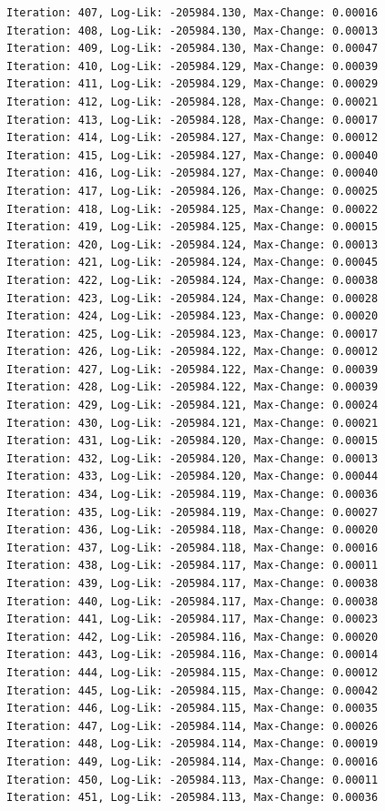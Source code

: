 \documentclass[
  letterpaper,
  DIV=11,
  numbers=noendperiod]{scrreport}
\begin{document}
\begin{verbatim}
Iteration: 407, Log-Lik: -205984.130, Max-Change: 0.00016
Iteration: 408, Log-Lik: -205984.130, Max-Change: 0.00013
Iteration: 409, Log-Lik: -205984.130, Max-Change: 0.00047
Iteration: 410, Log-Lik: -205984.129, Max-Change: 0.00039
Iteration: 411, Log-Lik: -205984.129, Max-Change: 0.00029
Iteration: 412, Log-Lik: -205984.128, Max-Change: 0.00021
Iteration: 413, Log-Lik: -205984.128, Max-Change: 0.00017
Iteration: 414, Log-Lik: -205984.127, Max-Change: 0.00012
Iteration: 415, Log-Lik: -205984.127, Max-Change: 0.00040
Iteration: 416, Log-Lik: -205984.127, Max-Change: 0.00040
Iteration: 417, Log-Lik: -205984.126, Max-Change: 0.00025
Iteration: 418, Log-Lik: -205984.125, Max-Change: 0.00022
Iteration: 419, Log-Lik: -205984.125, Max-Change: 0.00015
Iteration: 420, Log-Lik: -205984.124, Max-Change: 0.00013
Iteration: 421, Log-Lik: -205984.124, Max-Change: 0.00045
Iteration: 422, Log-Lik: -205984.124, Max-Change: 0.00038
Iteration: 423, Log-Lik: -205984.124, Max-Change: 0.00028
Iteration: 424, Log-Lik: -205984.123, Max-Change: 0.00020
Iteration: 425, Log-Lik: -205984.123, Max-Change: 0.00017
Iteration: 426, Log-Lik: -205984.122, Max-Change: 0.00012
Iteration: 427, Log-Lik: -205984.122, Max-Change: 0.00039
Iteration: 428, Log-Lik: -205984.122, Max-Change: 0.00039
Iteration: 429, Log-Lik: -205984.121, Max-Change: 0.00024
Iteration: 430, Log-Lik: -205984.121, Max-Change: 0.00021
Iteration: 431, Log-Lik: -205984.120, Max-Change: 0.00015
Iteration: 432, Log-Lik: -205984.120, Max-Change: 0.00013
Iteration: 433, Log-Lik: -205984.120, Max-Change: 0.00044
Iteration: 434, Log-Lik: -205984.119, Max-Change: 0.00036
Iteration: 435, Log-Lik: -205984.119, Max-Change: 0.00027
Iteration: 436, Log-Lik: -205984.118, Max-Change: 0.00020
Iteration: 437, Log-Lik: -205984.118, Max-Change: 0.00016
Iteration: 438, Log-Lik: -205984.117, Max-Change: 0.00011
Iteration: 439, Log-Lik: -205984.117, Max-Change: 0.00038
Iteration: 440, Log-Lik: -205984.117, Max-Change: 0.00038
Iteration: 441, Log-Lik: -205984.117, Max-Change: 0.00023
Iteration: 442, Log-Lik: -205984.116, Max-Change: 0.00020
Iteration: 443, Log-Lik: -205984.116, Max-Change: 0.00014
Iteration: 444, Log-Lik: -205984.115, Max-Change: 0.00012
Iteration: 445, Log-Lik: -205984.115, Max-Change: 0.00042
Iteration: 446, Log-Lik: -205984.115, Max-Change: 0.00035
Iteration: 447, Log-Lik: -205984.114, Max-Change: 0.00026
Iteration: 448, Log-Lik: -205984.114, Max-Change: 0.00019
Iteration: 449, Log-Lik: -205984.114, Max-Change: 0.00016
Iteration: 450, Log-Lik: -205984.113, Max-Change: 0.00011
Iteration: 451, Log-Lik: -205984.113, Max-Change: 0.00036

\end{verbatim}
\end{document}
